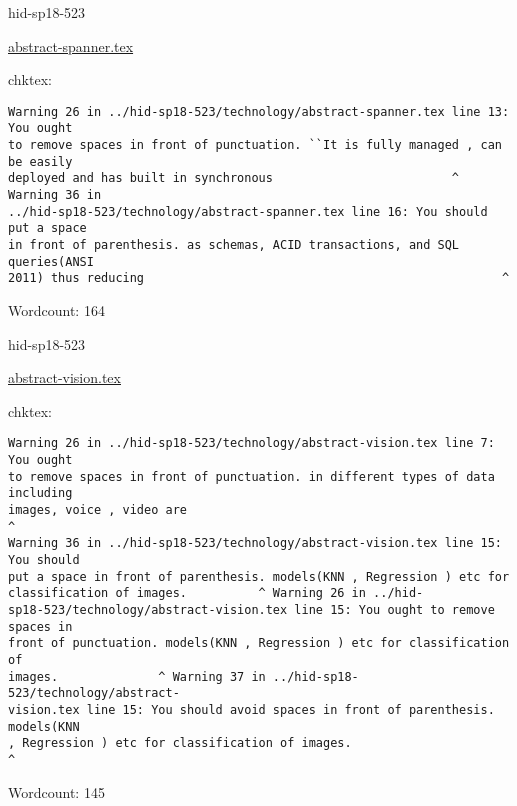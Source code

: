 \begin{IU}

hid-sp18-523

\href{https://github.com/cloudmesh-community/hid-sp18-523/blob/master//technology/abstract-spanner.tex}{abstract-spanner.tex}

 
chktex:
\begin{tiny}
\begin{verbatim}
Warning 26 in ../hid-sp18-523/technology/abstract-spanner.tex line 13: You ought
to remove spaces in front of punctuation. ``It is fully managed , can be easily
deployed and has built in synchronous                         ^ Warning 36 in
../hid-sp18-523/technology/abstract-spanner.tex line 16: You should put a space
in front of parenthesis. as schemas, ACID transactions, and SQL queries(ANSI
2011) thus reducing                                                  ^
\end{verbatim}
\end{tiny}

Wordcount: 164

\end{IU}



\begin{IU}

hid-sp18-523

\href{https://github.com/cloudmesh-community/hid-sp18-523/blob/master//technology/abstract-vision.tex}{abstract-vision.tex}

 
chktex:
\begin{tiny}
\begin{verbatim}
Warning 26 in ../hid-sp18-523/technology/abstract-vision.tex line 7: You ought
to remove spaces in front of punctuation. in different types of data including
images, voice , video are                                                      ^
Warning 36 in ../hid-sp18-523/technology/abstract-vision.tex line 15: You should
put a space in front of parenthesis. models(KNN , Regression ) etc for
classification of images.          ^ Warning 26 in ../hid-
sp18-523/technology/abstract-vision.tex line 15: You ought to remove spaces in
front of punctuation. models(KNN , Regression ) etc for classification of
images.              ^ Warning 37 in ../hid-sp18-523/technology/abstract-
vision.tex line 15: You should avoid spaces in front of parenthesis. models(KNN
, Regression ) etc for classification of images.                            ^
\end{verbatim}
\end{tiny}

Wordcount: 145

\end{IU}

